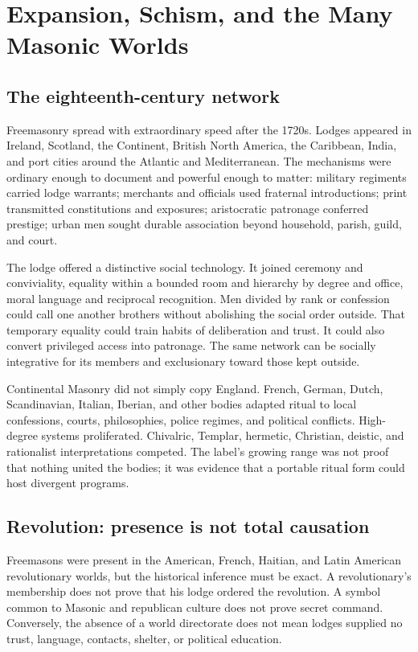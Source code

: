 \section{Expansion, Schism, and the Many Masonic Worlds}

\subsection{The eighteenth-century network}

Freemasonry spread with extraordinary speed after the 1720s. Lodges appeared in Ireland, Scotland, the Continent, British North America, the Caribbean, India, and port cities around the Atlantic and Mediterranean. The mechanisms were ordinary enough to document and powerful enough to matter: military regiments carried lodge warrants; merchants and officials used fraternal introductions; print transmitted constitutions and exposures; aristocratic patronage conferred prestige; urban men sought durable association beyond household, parish, guild, and court.

The lodge offered a distinctive social technology. It joined ceremony and conviviality, equality within a bounded room and hierarchy by degree and office, moral language and reciprocal recognition. Men divided by rank or confession could call one another brothers without abolishing the social order outside. That temporary equality could train habits of deliberation and trust. It could also convert privileged access into patronage. The same network can be socially integrative for its members and exclusionary toward those kept outside.

Continental Masonry did not simply copy England. French, German, Dutch, Scandinavian, Italian, Iberian, and other bodies adapted ritual to local confessions, courts, philosophies, police regimes, and political conflicts. High-degree systems proliferated. Chivalric, Templar, hermetic, Christian, deistic, and rationalist interpretations competed. The label's growing range was not proof that nothing united the bodies; it was evidence that a portable ritual form could host divergent programs.

\subsection{Revolution: presence is not total causation}

Freemasons were present in the American, French, Haitian, and Latin American revolutionary worlds, but the historical inference must be exact. A revolutionary's membership does not prove that his lodge ordered the revolution. A symbol common to Masonic and republican culture does not prove secret command. Conversely, the absence of a world directorate does not mean lodges supplied no trust, language, contacts, shelter, or political education.

